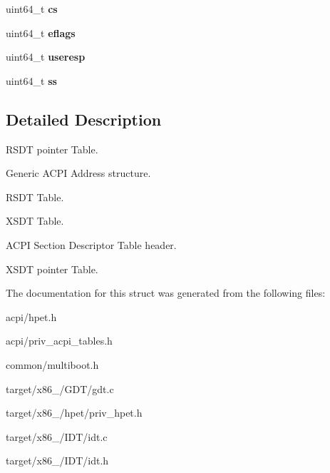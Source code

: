 \begin{DoxyCompactItemize}
\item 
uint64\+\_\+t {\bfseries cs}\hypertarget{struct____attribute_____a6bdf10d398bc6f802ef469f6c1535f89}{}\label{struct____attribute_____a6bdf10d398bc6f802ef469f6c1535f89}

\item 
uint64\+\_\+t {\bfseries eflags}\hypertarget{struct____attribute_____a943f9dbafa7729bb66784e717e2ed0ca}{}\label{struct____attribute_____a943f9dbafa7729bb66784e717e2ed0ca}

\item 
uint64\+\_\+t {\bfseries useresp}\hypertarget{struct____attribute_____a4d2e46475b2ab5d9e0de8d814e285927}{}\label{struct____attribute_____a4d2e46475b2ab5d9e0de8d814e285927}

\item 
uint64\+\_\+t {\bfseries ss}\hypertarget{struct____attribute_____a3626a02504eb9e597c3449ddff9830cd}{}\label{struct____attribute_____a3626a02504eb9e597c3449ddff9830cd}

\end{DoxyCompactItemize}


\subsection{Detailed Description}
R\+S\+DT pointer Table. 

Generic A\+C\+PI Address structure.

R\+S\+DT Table.

X\+S\+DT Table.

A\+C\+PI Section Descriptor Table header.

X\+S\+DT pointer Table. 

The documentation for this struct was generated from the following files\+:\begin{DoxyCompactItemize}
\item 
acpi/hpet.\+h\item 
acpi/priv\+\_\+acpi\+\_\+tables.\+h\item 
common/multiboot.\+h\item 
target/x86\+\_/\+G\+D\+T/gdt.\+c\item 
target/x86\+\_/hpet/priv\+\_\+hpet.\+h\item 
target/x86\+\_/\+I\+D\+T/idt.\+c\item 
target/x86\+\_/\+I\+D\+T/idt.\+h\end{DoxyCompactItemize}
